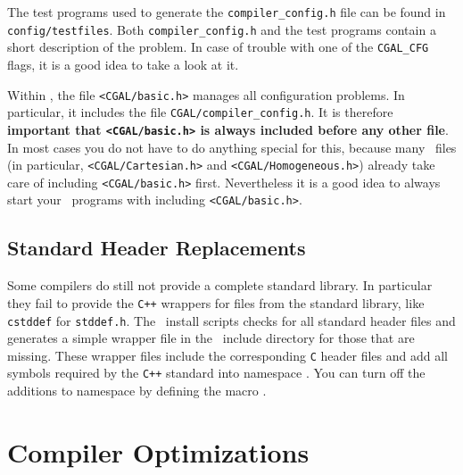 The test programs used to generate the \texttt{compiler\_config.h}
file can be found in \texttt{config/testfiles}.
 Both
\texttt{compiler\_config.h} and the test programs contain a short
description of the problem. In case of trouble with one of the
\texttt{CGAL\_CFG} flags, it is a good idea to take a look at it.

Within \cgal, the file \texttt{<CGAL/basic.h>}
 manages all configuration problems. In
particular, it includes the file \texttt{CGAL/compiler\_config.h}. It
is therefore \textbf{important that \texttt{<CGAL/basic.h>} is always
  included before any other file}. In most cases you do not have to do
anything special for this, because many \cgal\ files (in particular,
\texttt{<CGAL/Cartesian.h>} and \texttt{<CGAL/Homogeneous.h>}) already
take care of including \texttt{<CGAL/basic.h>} first. Nevertheless it
is a good idea to always start your \cgal\ programs with including
\texttt{<CGAL/basic.h>}.

\subsection{Standard Header Replacements}

Some compilers do still not provide a complete standard library. In
particular they fail to provide the \texttt{C++} wrappers for files
from the standard  library, like \texttt{cstddef} for
\texttt{stddef.h}. The \cgal\ install scripts checks for all standard
header files and generates a simple wrapper file in the \cgal\ include
directory for those that are missing. These wrapper files include the
corresponding \texttt{C} header files and add all symbols required by
the \texttt{C++} standard into namespace . You can turn off
the additions to namespace  by defining the macro
.

\section{Compiler Optimizations}\label{sec:compiler-optimisations}

